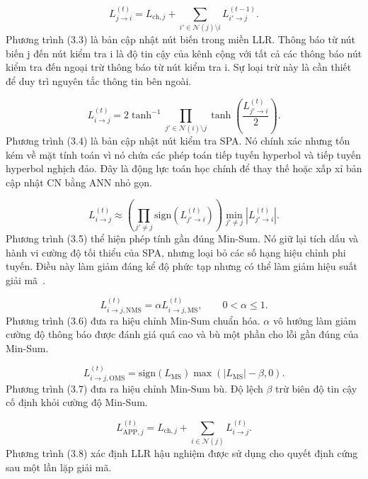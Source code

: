 \begin{equation}
L_{j\rightarrow i}^{(t)}=L_{\mathrm{ch},j}+\sum_{i'\in\mathcal{N}(j)\setminus i}L_{i'\rightarrow j}^{(t-1)}.
\end{equation}
Phương trình (3.3) là bản cập nhật nút biến trong miền LLR. Thông báo từ nút biến j đến nút kiểm tra i là độ tin cậy của kênh cộng với tất cả các thông báo nút kiểm tra đến ngoại trừ thông báo từ nút kiểm tra i. Sự loại trừ này là cần thiết để duy trì nguyên tắc thông tin bên ngoài.

\begin{equation}
L_{i\rightarrow j}^{(t)}=
2\tanh^{-1}\!\prod_{j'\in\mathcal{N}(i)\setminus j}\tanh\!\left(\frac{L_{j'\rightarrow i}^{(t)}}{2}\right).
\end{equation}
Phương trình (3.4) là bản cập nhật nút kiểm tra SPA. Nó chính xác nhưng tốn kém về mặt tính toán vì nó chứa các phép toán tiếp tuyến hyperbol và tiếp tuyến hyperbol nghịch đảo. Đây là động lực toán học chính để thay thế hoặc xấp xỉ bản cập nhật CN bằng ANN nhỏ gọn.

\begin{equation}
L_{i\rightarrow j}^{(t)}\approx
\left(\prod_{j'\ne j}\mathrm{sign}(L_{j'\rightarrow i}^{(t)})\right)
\min_{j'\ne j}|L_{j'\rightarrow i}^{(t)}|.
\end{equation}
Phương trình (3.5) thể hiện phép tính gần đúng Min-Sum. Nó giữ lại tích dấu và hành vi cường độ tối thiểu của SPA, nhưng loại bỏ các số hạng hiệu chỉnh phi tuyến. Điều này làm giảm đáng kể độ phức tạp nhưng có thể làm giảm hiệu suất giải mã~.

\begin{equation}
L_{i\rightarrow j,\mathrm{NMS}}^{(t)}=\alpha L_{i\rightarrow j,\mathrm{MS}}^{(t)},\qquad 0<\alpha\le 1.
\end{equation}
Phương trình (3.6) đưa ra hiệu chỉnh Min-Sum chuẩn hóa. $\alpha$ vô hướng làm giảm cường độ thông báo được đánh giá quá cao và bù một phần cho lỗi gần đúng của Min-Sum.

\begin{equation}
L_{i\rightarrow j,\mathrm{OMS}}^{(t)}=\mathrm{sign}(L_{\mathrm{MS}})\max(|L_{\mathrm{MS}}|-\beta,0).
\end{equation}
Phương trình (3.7) đưa ra hiệu chỉnh Min-Sum bù. Độ lệch $\beta$ trừ biên độ tin cậy cố định khỏi cường độ Min-Sum.

\begin{equation}
L_{\mathrm{APP},j}^{(t)}=L_{\mathrm{ch},j}+\sum_{i\in\mathcal{N}(j)}L_{i\rightarrow j}^{(t)}.
\end{equation}
Phương trình (3.8) xác định LLR hậu nghiệm được sử dụng cho quyết định cứng sau một lần lặp giải mã.

